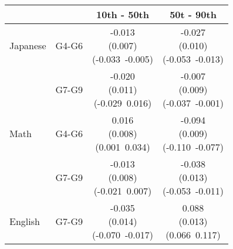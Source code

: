 \begin{tabular}{llcc}
\hline \hline 
 &  & 10th - 50th & 50t - 90th \\
\hline
Japanese & G4-G6 & \makecell[tc]{-0.013\\(0.007)\\(-0.033~-0.005)} & \makecell[tc]{-0.027\\(0.010)\\(-0.053~-0.013)} \\
 & G7-G9 & \makecell[tc]{-0.020\\(0.011)\\(-0.029~0.016)} & \makecell[tc]{-0.007\\(0.009)\\(-0.037~-0.001)} \\
\hline 
Math & G4-G6 & \makecell[tc]{0.016\\(0.008)\\(0.001~0.034)} & \makecell[tc]{-0.094\\(0.009)\\(-0.110~-0.077)} \\
 & G7-G9 & \makecell[tc]{-0.013\\(0.008)\\(-0.021~0.007)} & \makecell[tc]{-0.038\\(0.013)\\(-0.053~-0.011)} \\
\hline 
English  & G7-G9 & \makecell[tc]{-0.035\\(0.014)\\(-0.070~-0.017)} & \makecell[tc]{0.088\\(0.013)\\(0.066~0.117)} \\
\hline \hline 
\end{tabular}